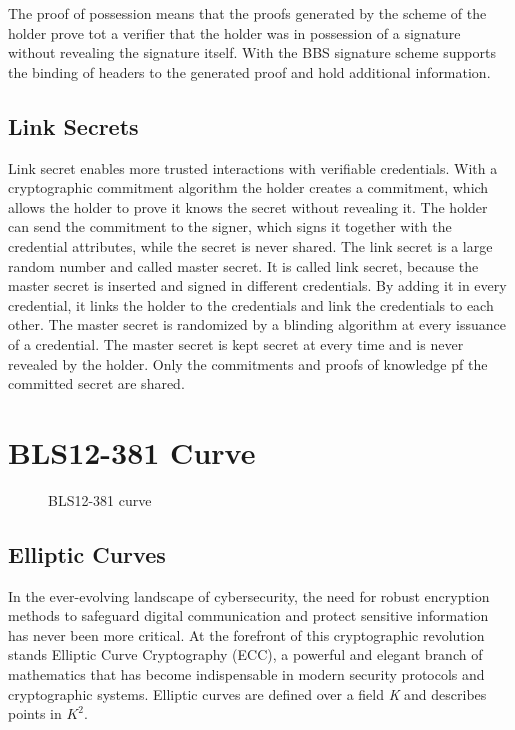 \documentclass{article}
\begin{document}
The proof of possession means that the proofs generated by the scheme of the holder prove tot a verifier that the holder was in possession of a signature without revealing the signature itself. With the BBS signature scheme supports the binding of headers to the generated proof and hold additional information. 

\subsection{Link Secrets}

Link secret enables more trusted interactions with verifiable credentials. With a cryptographic commitment algorithm the holder creates a commitment, which allows the holder to prove it knows the secret without revealing it. The holder can send the commitment to the signer, which signs it together with the credential attributes, while the secret is never shared. The link secret is a large random number and called master secret. 
It is called link secret, because the master secret is inserted and signed in different credentials. By adding it in every credential, it links the holder to the credentials and link the credentials to each other. The master secret is randomized by a blinding algorithm at every issuance of a credential. The master secret is kept secret at every time and is never revealed by the holder. Only the commitments and proofs of knowledge pf the committed secret are shared.

\section{BLS12-381 Curve}
\begin{figure}[H]
\centering
\caption{BLS12-381 curve}
\label{Fig: BLS12-381}
\end{figure}

\subsection{Elliptic Curves}

In the ever-evolving landscape of cybersecurity, the need for robust encryption methods to safeguard digital communication and protect sensitive information has never been more critical. At the forefront of this cryptographic revolution stands Elliptic Curve Cryptography (ECC), a powerful and elegant branch of mathematics that has become indispensable in modern security protocols and cryptographic systems. 
Elliptic curves are defined over a field \textit{K} and describes points in \(K^2\).
\end{document}
